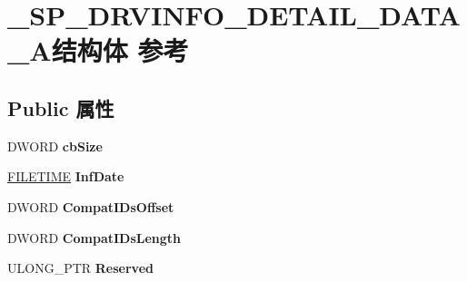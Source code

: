 \hypertarget{struct___s_p___d_r_v_i_n_f_o___d_e_t_a_i_l___d_a_t_a___a}{}\section{\+\_\+\+S\+P\+\_\+\+D\+R\+V\+I\+N\+F\+O\+\_\+\+D\+E\+T\+A\+I\+L\+\_\+\+D\+A\+T\+A\+\_\+\+A结构体 参考}
\label{struct___s_p___d_r_v_i_n_f_o___d_e_t_a_i_l___d_a_t_a___a}
\subsection*{Public 属性}
\begin{DoxyCompactItemize}
\item 
\mbox{\label{struct___s_p___d_r_v_i_n_f_o___d_e_t_a_i_l___d_a_t_a___a_ad04cc5633069a79de3fcc70903a4ffcc}} 
D\+W\+O\+RD {\bfseries cb\+Size}
\item 
\mbox{\label{struct___s_p___d_r_v_i_n_f_o___d_e_t_a_i_l___d_a_t_a___a_ac2192489cc2de8325e29201eaec676c2}} 
\hyperlink{struct___f_i_l_e_t_i_m_e}{F\+I\+L\+E\+T\+I\+ME} {\bfseries Inf\+Date}
\item 
\mbox{\label{struct___s_p___d_r_v_i_n_f_o___d_e_t_a_i_l___d_a_t_a___a_aea6ef05a05e4aac281ee0278c4188a13}} 
D\+W\+O\+RD {\bfseries Compat\+I\+Ds\+Offset}
\item 
\mbox{\label{struct___s_p___d_r_v_i_n_f_o___d_e_t_a_i_l___d_a_t_a___a_a57b6d30032d75a353bbeba403c220363}} 
D\+W\+O\+RD {\bfseries Compat\+I\+Ds\+Length}
\item 
\mbox{\label{struct___s_p___d_r_v_i_n_f_o___d_e_t_a_i_l___d_a_t_a___a_ac469bec593635e8c0de6c846a0401eb7}} 
U\+L\+O\+N\+G\+\_\+\+P\+TR {\bfseries Reserved}
\item 
\mbox{\label{struct___s_p___d_r_v_i_n_f_o___d_e_t_a_i_l___d_a_t_a___a_af3a6de6635476e073454a078de1be13b}} 

\end{DoxyCompactItemize}
